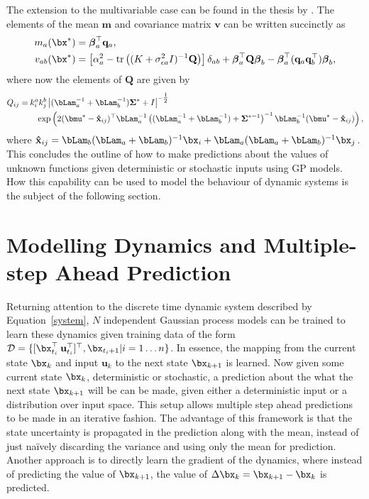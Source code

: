 The extension to the multivariable case can be found in the thesis by \cite{Dei09}. The elements of the mean $\mathbf{m}$ and covariance matrix $\mathbf{v}$ can be written succinctly as
\begin{align}
m_a(\bx^*) &= \boldsymbol{\beta}_a^\top \mathbf{q}_a, \label{MMM}\\
v_{ab}(\bx^*) &=
\left[ \alpha_a^2 - \mathrm{tr}\left( (K+\sigma^2_{\epsilon a} I)^{-1} \mathbf{Q}  \right) \right] \delta_{ab} +
\boldsymbol{\beta}^\top_a\mathbf{Q} \boldsymbol{\beta}_b -
\boldsymbol{\beta}^\top_a (\mathbf{q}_a \mathbf{q}_b^\top) \boldsymbol{\beta}_b, \label{MMV}
\end{align}
where now the elements of $\mathbf{Q}$ are given by
\begin{align}
\label{Qdef}
Q_{ij} =&\: k^a_i k^b_j
\left|(\bLam_a^{-1} + \bLam_b^{-1})
        \mathbf{\Sigma}^* + I  \right|^{-\tfrac{1}{2}} \\
\nonumber&\quad \exp  \left( 
2(\bmu^*  -  \mathbf{\hat x}_{ij})^\top \bLam_a^{-1}
\left((\bLam_a^{-1} + \bLam_b^{-1}) + 
\mathbf{\Sigma}^{*-1}\right)^{-1}  \bLam_b^{-1}
(\bmu^*  -  \mathbf{\hat x}_{ij}) \right),
\end{align}
where $\mathbf{\hat x}_{ij} = \bLam_b(\bLam_a + \bLam_b)^{-1}\bx_i + \bLam_a(\bLam_a + \bLam_b)^{-1}\bx_j$. This concludes the outline of how to make predictions about the values of unknown functions given deterministic or stochastic inputs using GP models. How this capability can be used to model the behaviour of dynamic systems is the subject of the following section.




\section{Modelling Dynamics and Multiple-step Ahead Prediction}
Returning attention to the discrete time dynamic system described by Equation~\eqref{system}, $N$ independent Gaussian process models can be trained to learn these dynamics given training data of the form $\mathcal{D}=\{[\bx_{t_i}^\top \:\mathbf{u}_{t_i}^\top]^\top, \bx_{t_i+1} | i=1\dots n \}$. In essence, the mapping from the current state $\bx_k$ and input $\mathbf{u}_k$ to the next state $\bx_{k+1}$ is learned. Now given some current state $\bx_k$, deterministic or stochastic, a prediction about the what the next state $\bx_{k+1}$ will be can be made, given either a deterministic input or a distribution over input space. This setup allows multiple step ahead predictions to be made in an iterative fashion. The advantage of this framework is that the state uncertainty is propagated in the prediction along with the mean, instead of just na\"{i}vely discarding the variance and using only the mean for prediction. Another approach is to directly learn the gradient of the dynamics, where instead of predicting the value of $\bx_{k+1}$, the value of $\Delta\bx_k = \bx_{k+1} - \bx_k$ is predicted.


